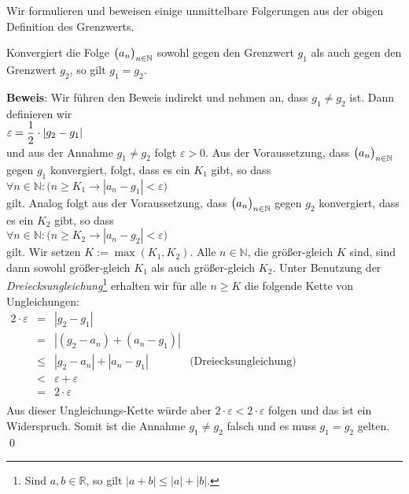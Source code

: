 \noindent
Wir formulieren und beweisen einige unmittelbare Folgerungen aus der obigen Definition des Grenzwerts.
\begin{Satz}
Konvergiert die Folge $\bigl(a_n\bigr)_{n\in\mathbb{N}}$ sowohl gegen den Grenzwert $g_1$ als auch gegen den
Grenzwert $g_2$, so gilt $g_1 = g_2$.
\end{Satz}
\textbf{Beweis}:  Wir f\"uhren den Beweis indirekt und nehmen an, dass $g_1 \not= g_2$ ist.
Dann definieren wir
\\[0.2cm]
\hspace*{1.3cm}
 $\displaystyle\varepsilon = \frac{1}{2}\cdot|g_2 - g_1|$ 
\\[0.2cm]
und aus der Annahme $g_1 \not= g_2$ folgt
$\varepsilon > 0$.  Aus der Voraussetzung, dass $\bigl(a_n\bigr)_{n\in\mathbb{N}}$ gegen $g_1$ konvergiert,
folgt, dass es ein $K_1$ gibt, so dass 
\\[0.2cm]
\hspace*{1.3cm}
$\forall n \in \mathbb{N}:\bigl( n \geq K_1 \rightarrow | a_n - g_1 | < \varepsilon\bigr)$
\\[0.2cm]
gilt.  Analog folgt  aus der Voraussetzung, dass $\bigl(a_n\bigr)_{n\in\mathbb{N}}$ gegen $g_2$ konvergiert,
dass es ein $K_2$ gibt, so dass 
\\[0.2cm]
\hspace*{1.3cm}
$\forall n \in \mathbb{N}:\bigl( n \geq K_2 \rightarrow | a_n - g_2 | < \varepsilon\bigr)$
\\[0.2cm]
gilt.  Wir setzen $K := \max(K_1, K_2)$.  Alle $n\in\mathbb{N}$, die gr\"o\ss{}er-gleich $K$ sind,
sind dann sowohl gr\"o\ss{}er-gleich $K_1$ als auch gr\"o\ss{}er-gleich $K_2$. Unter Benutzung der 
\emph{Dreiecksungleichung}\footnote{
Sind $a, b\in \mathbb{R}$, so gilt $|a+b| \leq |a| + |b|$.}
erhalten wir f\"ur alle $n \geq K$ die folgende Kette von Ungleichungen:
\\[0.2cm]
\hspace*{1.3cm}
$
\begin{array}{lcll}  
   2 \cdot \varepsilon & = & |g_2 - g_1| \\
                   & = & |(g_2 - a_n) + (a_n - g_1)| \\
                   & \leq & |g_2 - a_n| + |a_n - g_1| 
                          & \mbox{(Dreiecksungleichung)} \\
                   & < & \varepsilon + \varepsilon \\
                   & = & 2 \cdot \varepsilon \\
\end{array}
$
\\[0.2cm]
Aus dieser Ungleichungs-Kette w\"urde aber $2\cdot \varepsilon < 2\cdot \varepsilon$ folgen und das
ist ein Widerspruch.  Somit ist die Annahme $g_1 \not= g_2$ falsch und es muss $g_1 = g_2$
gelten.  
\qed

